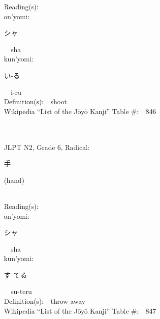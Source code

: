 \begin{multicols}{2}
Reading(s):\ \ \\
{\hspace*{1em}}on'yomi:\ \ \\
{\hspace*{2em}}{\begin{CJK}{UTF8}{min} シャ \end{CJK}}\ \ sha\ \ \\
{\hspace*{1em}}kun'yomi:\ \ \\
{\hspace*{2em}}{\begin{CJK}{UTF8}{min} い-る \end{CJK}}\ \ i-ru\ \ \\
Definition(s):\ \ shoot \\
Wikipedia ``List of the J\=oy\=o Kanji'' Table \#:\ \ 846 \\
\ \ \\
{\fontsize{34pt}{40pt}  }\ \ \\  %
{JLPT N2, Grade 6, Radical:\ \ {\begin{CJK}{UTF8}{min} 手 \end{CJK}} (hand) } \\
Reading(s):\ \ \\
{\hspace*{1em}}on'yomi:\ \ \\
{\hspace*{2em}}{\begin{CJK}{UTF8}{min} シャ \end{CJK}}\ \ sha\ \ \\
{\hspace*{1em}}kun'yomi:\ \ \\
{\hspace*{2em}}{\begin{CJK}{UTF8}{min} す-てる \end{CJK}}\ \ su-teru\ \ \\
Definition(s):\ \ throw away \\
Wikipedia ``List of the J\=oy\=o Kanji'' Table \#:\ \ 847 \\
\ \ \\
{\fontsize{34pt}{40pt}  }\ \ \\  %

\end{multicols}

